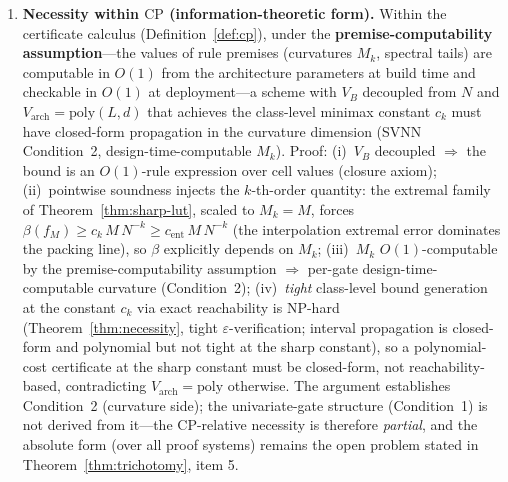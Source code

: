 \begin{theorem}
\begin{enumerate}
    \item \textbf{Necessity within $\text{CP}$ (information-theoretic
    form).} Within the certificate calculus
    (Definition~\ref{def:cp}), under the \textbf{premise-computability
    assumption}---the values of rule premises (curvatures $M_k$, spectral
    tails) are computable in $O(1)$ from the architecture parameters at
    build time and checkable in $O(1)$ at deployment---a scheme with
    $V_B$ decoupled from $N$ and $V_{\text{arch}} = \text{poly}(L,d)$
    that achieves the class-level minimax constant $c_k$ must have
    closed-form propagation in the curvature dimension (SVNN Condition~2,
    design-time-computable $M_k$). Proof: (i)~$V_B$ decoupled
    $\Rightarrow$ the bound is an $O(1)$-rule expression over cell
    values (closure axiom); (ii)~pointwise soundness injects the
    $k$-th-order quantity: the extremal family of
    Theorem~\ref{thm:sharp-lut}, scaled to $M_k = M$, forces
    $\beta(f_M) \geq c_k\, M\, N^{-k} \geq c_{\mathrm{ent}}\, M\,
    N^{-k}$ (the interpolation extremal error dominates the packing
    line), so $\beta$ explicitly depends on $M_k$; (iii)~$M_k$
    $O(1)$-computable by the premise-computability assumption
    $\Rightarrow$ per-gate design-time-computable curvature (Condition~2);
    (iv)~\emph{tight} class-level bound generation at the constant
    $c_k$ via exact reachability is NP-hard (Theorem~\ref{thm:necessity},
    tight $\varepsilon$-verification; interval propagation is
    closed-form and polynomial but not tight at the sharp constant), so
    a polynomial-cost certificate at the sharp constant must be
    closed-form, not reachability-based, contradicting
    $V_{\text{arch}} = \text{poly}$ otherwise. The argument establishes
    Condition~2 (curvature side); the univariate-gate structure
    (Condition~1) is not derived from it---the CP-relative necessity is
    therefore \emph{partial}, and the absolute form (over all proof
    systems) remains the open problem stated in
    Theorem~\ref{thm:trichotomy}, item 5.
    \end{enumerate}
\end{theorem}

